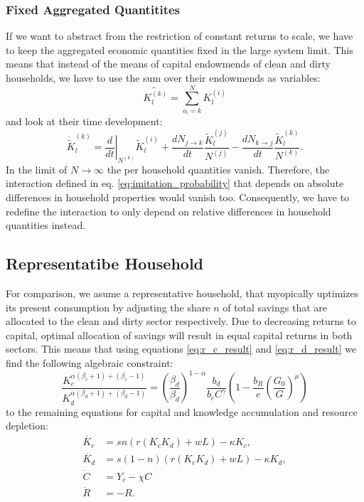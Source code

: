 \subsubsection*{Fixed Aggregated Quantitites}
If we want to abstract from the restriction of constant returns to scale, we have to keep the aggregated economic quantities fixed in the large system limit. This means that instead of the means of capital endowmends of clean and dirty households, we have to use the sum over their endowmends as variables:
\begin{equation}
	\tilde{K_l^{(k)}} = \sum_{o_i=k}^{N}K_l^{(i)}
	\label{eq:not_normalized_moments_definition}
\end{equation}
and look at their time development:
\begin{equation}
	\dot{\tilde{K}}_{l}^{(k)} = \left. \frac{d}{dt} \right|_{N^{(k)}}\tilde{K}^{(i)}_{l} + \frac{d N_{j \rightarrow k}}{dt}\frac{\tilde{K}_l^{(j)}}{N^{(j)}} - \frac{d N_{k \rightarrow j}}{dt}\frac{\tilde{K}_l^{(k)}}{N^{(k)}}.
	\label{eq:aggregated_capital_time_derivative}
\end{equation}
In the limit of $N \rightarrow \infty$ the per household quantities vanish. Therefore, the interaction defined in eq. \eqref{eq:imitation_probability} that depends on absolute differences in household properties would vanish too. Consequently, we have to redefine the interaction to only depend on relative differences in household quantities instead.
\par
{}
\subsection{Representatibe Household}
For comparison, we asume a representative household, that myopically uptimizes its present consumption by adjusting the share $n$ of total savings that are allocated to the clean and dirty sector respectively.
Due to decreasing returns to capital, optimal allocation of savings will result in equal capital returns in both sectors. This means that using equations \eqref{eq:r_c_result} and \eqref{eq:r_d_result} we find the following algebraic constraint:
\begin{equation}
	\frac{K_c^{\alpha(\beta_c+1)+(\beta_c-1)}}{K_d^{\alpha(\beta_d + 1)+(\beta_d-1)}} = \left( \frac{\beta_d}{\beta_d} \right)^{1-\alpha}\frac{b_d}{b_c C^{\gamma}}\left( 1 - \frac{b_R}{e}\left( \frac{G_0}{G} \right)^{\mu} \right)
	\label{eq:r_a_constraint}
\end{equation}
to the remaining equations for capital and knowledge accumulation and resource depletion:
\begin{align}
	\dot{K_c} &= s n (r (K_c K_d) + w L) - \kappa K_c, \\
	\dot{K_d} &= s (1-n)(r (K_c K_d) + w L) - \kappa K_d, \\
	\dot{C} &= Y_c - \chi C \\
	\dot{R} &= -R.
	\label{eq:ra_capital accumulation}
\end{align}

